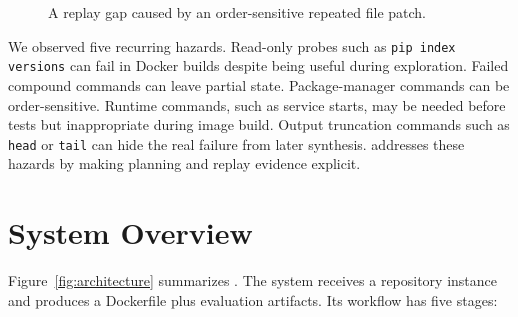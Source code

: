 \begin{figure}[t]
\centering
{}
\caption{A replay gap caused by an order-sensitive repeated file patch.}
\label{fig:replay-gap}
\end{figure}

We observed five recurring hazards.
Read-only probes such as \texttt{pip index versions} can fail in Docker builds despite being useful during exploration.
Failed compound commands can leave partial state.
Package-manager commands can be order-sensitive.
Runtime commands, such as service starts, may be needed before tests but inappropriate during image build.
Output truncation commands such as \texttt{head} or \texttt{tail} can hide the real failure from later synthesis.
\tool addresses these hazards by making planning and replay evidence explicit.

\section{System Overview}

Figure~\ref{fig:architecture} summarizes \tool.
The system receives a repository instance and produces a Dockerfile plus evaluation artifacts.
Its workflow has five stages:

